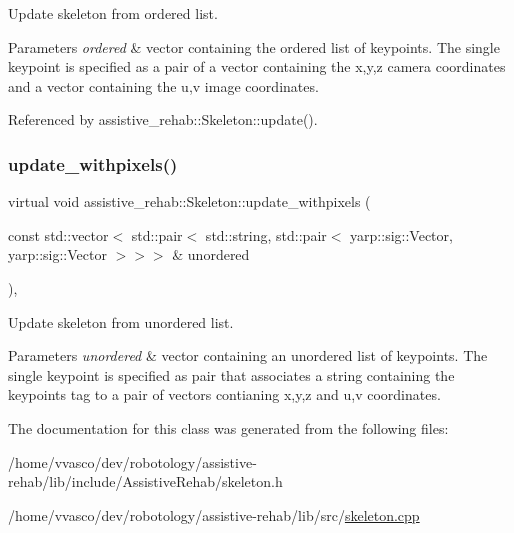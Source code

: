 Update skeleton from ordered list. 


\begin{DoxyParams}{Parameters}
{\em ordered} & vector containing the ordered list of keypoints. The single keypoint is specified as a pair of a vector containing the x,y,z camera coordinates and a vector containing the u,v image coordinates. \\
\hline
\end{DoxyParams}


Referenced by assistive\+\_\+rehab\+::\+Skeleton\+::update().

\mbox{\label{classassistive__rehab_1_1Skeleton_a36e9dfd4910120025e40ccc3d03c0e01}} 
\subsubsection{\texorpdfstring{update\+\_\+withpixels()}{update\_withpixels()}\hspace{0.1cm}{\footnotesize\ttfamily [2/2]}}
{\footnotesize\ttfamily virtual void assistive\+\_\+rehab\+::\+Skeleton\+::update\+\_\+withpixels (\begin{DoxyParamCaption}\item[{const std\+::vector$<$ std\+::pair$<$ std\+::string, std\+::pair$<$ yarp\+::sig\+::\+Vector, yarp\+::sig\+::\+Vector $>$$>$$>$ \&}]{unordered }\end{DoxyParamCaption})\hspace{0.3cm}{\ttfamily [virtual]}, {\ttfamily [inherited]}}



Update skeleton from unordered list. 


\begin{DoxyParams}{Parameters}
{\em unordered} & vector containing an unordered list of keypoints. The single keypoint is specified as pair that associates a string containing the keypoint\textquotesingle{}s tag to a pair of vectors contianing x,y,z and u,v coordinates. \\
\hline
\end{DoxyParams}


The documentation for this class was generated from the following files\+:\begin{DoxyCompactItemize}
\item 
/home/vvasco/dev/robotology/assistive-\/rehab/lib/include/\+Assistive\+Rehab/skeleton.\+h\item 
/home/vvasco/dev/robotology/assistive-\/rehab/lib/src/\hyperlink{skeleton_8cpp}{skeleton.\+cpp}\end{DoxyCompactItemize}
